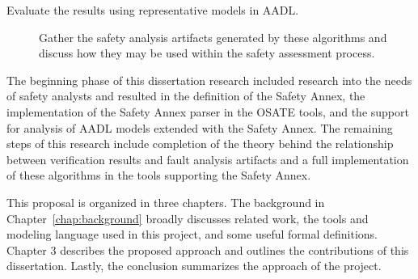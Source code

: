 \begin{description}
\item[Evaluate the results using representative models in AADL.] Gather the safety analysis artifacts generated by these algorithms and discuss how they may be used within the safety assessment process.
\end{description}

The beginning phase of this dissertation research included research into the needs of safety analysts and resulted in the definition of the Safety Annex, the implementation of the Safety Annex parser in the OSATE tools, and the support for analysis of AADL models extended with the Safety Annex. The remaining steps of this research include completion of the theory behind the relationship between verification results and fault analysis artifacts and a full implementation of these algorithms in the tools supporting the Safety Annex. 

This proposal is organized in three chapters. The background in Chapter~\ref{chap:background} broadly discusses related work, the tools and modeling language used in this project, and some useful formal definitions. Chapter 3 describes the proposed approach and outlines the contributions of this dissertation. Lastly, the conclusion summarizes the approach of the project.



